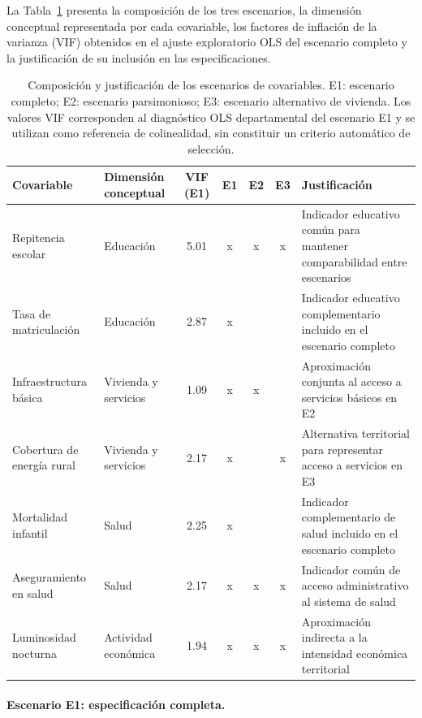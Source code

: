 La Tabla~\ref{tab:escenarios} presenta la composición de los tres escenarios, la dimensión conceptual representada por cada covariable, los factores de inflación de la varianza (VIF) obtenidos en el ajuste exploratorio OLS del escenario completo y la justificación de su inclusión en las especificaciones.

\begin{table}[!htbp]
\centering
\footnotesize
\caption{Composición y justificación de los escenarios de covariables. E1: escenario completo; E2: escenario parsimonioso; E3: escenario alternativo de vivienda. Los valores VIF corresponden al diagnóstico OLS departamental del escenario E1 y se utilizan como referencia de colinealidad, sin constituir un criterio automático de selección.}
\label{tab:escenarios}
\renewcommand{\arraystretch}{1.2}
\begin{tabular}{p{2.4cm} p{2.3cm} c c c c p{3.6cm}}
\hline
Covariable & Dimensión conceptual & VIF (E1) & E1 & E2 & E3 & Justificación \\
\hline
Repitencia escolar & Educación & 5.01 & x & x & x & Indicador educativo común para mantener comparabilidad entre escenarios \\
Tasa de matriculación & Educación & 2.87 & x & & & Indicador educativo complementario incluido en el escenario completo \\
Infraestructura básica & Vivienda y servicios & 1.09 & x & x & & Aproximación conjunta al acceso a servicios básicos en E2 \\
Cobertura de energía rural & Vivienda y servicios & 2.17 & x & & x & Alternativa territorial para representar acceso a servicios en E3 \\
Mortalidad infantil & Salud & 2.25 & x & & & Indicador complementario de salud incluido en el escenario completo \\
Aseguramiento en salud & Salud & 2.17 & x & x & x & Indicador común de acceso administrativo al sistema de salud \\
Luminosidad nocturna & Actividad económica & 1.94 & x & x & x & Aproximación indirecta a la intensidad económica territorial \\
\hline
\end{tabular}
\end{table}

\paragraph{Escenario E1: especificación completa.}

